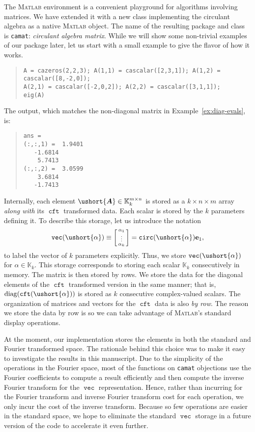 \documentclass[1p,authoryear,letterpaper]{elsarticle}
\DeclareMathOperator{\tcirc}{\texttt{circ}}
\DeclareMathOperator{\tvec}{\texttt{vec}}
\providecommand{\eqdef}{\equiv}
\providecommand{\KK}{\mathbb{K}}
\providecommand{\sbmat}[1]{\left[\begin{smallmatrix} #1 \end{smallmatrix}\right]}
\providecommand{\mat}{\boldsymbol}
\renewcommand{\vec}{\mathbf}
\providecommand{\ve}{\ensuremath{\vec{e}}}
\DeclareMathOperator{\cft}{\texttt{cft}}
\newcommand{\cel}[1]{\ushort{#1}}
\newcommand{\celm}[1]{\cel{\mat{#1}}}
\newcommand{\calpha}{\ensuremath{\cel{\alpha}}}
\providecommand{\cmA}{\ensuremath{\celm{A}}}
\newcommand{\Matlab}{\textsc{Matlab}\xspace}
\begin{document}
The \Matlab environment is a convenient playground
for algorithms involving matrices.  We have extended
it with a new 
class implementing the circulant algebra as a native
\Matlab object.  The
name of the resulting package and class 
is \texttt{camat}: \emph{circulant algebra matrix}.
While we will show some non-trivial examples of our package
later, let us start with a small example to give the
flavor of how it works.
\begin{quote}
\begin{verbatim}
A = cazeros(2,2,3); A(1,1) = cascalar([2,3,1]); A(1,2) = cascalar([8,-2,0]);
A(2,1) = cascalar([-2,0,2]); A(2,2) = cascalar([3,1,1]);
eig(A)          \end{verbatim}
\end{quote}
The output, which matches the non-diagonal matrix in Example~\ref{ex:diag-evals}, is:
\begin{quote}
\begin{verbatim}
ans =
(:,:,1) =  1.9401
   -1.6814
    5.7413
(:,:,2) =  3.0599
    3.6814
   -1.7413
\end{verbatim}
\end{quote}



Internally, each element $\cmA \in \KK_k^{m \times n}$
is stored as a $k \times n \times m$ array \emph{along
with} its $\cft$ transformed data.  Each scalar is
stored by the $k$ parameters defining it.  To describe
this storage, let us introduce the notation
\[ \tvec(\calpha) \eqdef \sbmat{ \alpha_1 \\ \vdots \\ \alpha_k} = \tcirc(\calpha) \ve_1 , \]
to label the vector of $k$ parameters explicitly.  Thus, 
we store $\tvec(\calpha)$ for $\alpha \in \KK_k$.  This storage
corresponds to storing each scalar $\KK_k$ consecutively
in memory.   The matrix is then stored by rows.  We store
the data for the diagonal elements of the $\cft$ transformed
version in the same manner; that is, $\diag(\cft(\calpha))$
is stored as $k$ consecutive complex-valued scalars.  The
organization of matrices and vectors for the $\cft$ data
is also \emph{by row}.
The reason we store the data by row is so we can take
advantage of \Matlab's standard display operations.


At the moment, our implementation stores the elements
in both the standard and Fourier transformed space.  The rationale
behind this choice was to make it easy to investigate the results
in this manuscript.  Due to the simplicity of the operations
in the Fourier space, most of the functions on \texttt{camat}
objections use the Fourier coefficients to compute a result efficiently
and then compute
the inverse Fourier transform for the $\tvec$ representation.
Hence, rather than incurring for the Fourier transform and
inverse Fourier transform cost for each operation, we only
incur the cost of the inverse transform.  Because so few operations
are easier in the standard space, we hope to eliminate the
standard $\tvec$ storage in a future version of the code to accelerate
it even further.
\end{document}
